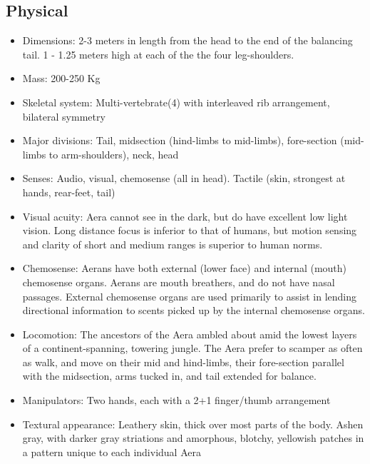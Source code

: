 \subsection{Physical}
\begin{itemize}
\item Dimensions: 2-3 meters in length from the head to the end of the balancing tail. 1 - 1.25 meters high at each of the the four leg-shoulders.

\item Mass: 200-250 Kg

\item Skeletal system: Multi-vertebrate(4) with interleaved rib arrangement, bilateral symmetry

\item Major divisions: Tail, midsection (hind-limbs to mid-limbs), fore-section (mid-limbs to arm-shoulders), neck, head

\item Senses: Audio, visual, chemosense (all in head). Tactile (skin, strongest at hands, rear-feet, tail)

\item Visual acuity: Aera cannot see in the dark, but do have excellent low light vision. Long distance focus is inferior to that of humans, but motion sensing and clarity of short and medium ranges is superior to human norms. 

\item Chemosense: Aerans have both external (lower face) and internal (mouth) chemosense organs. Aerans are mouth breathers, and do not have nasal passages. External chemosense organs are used primarily to assist in lending directional information to scents picked up by the internal chemosense organs. 

\item Locomotion: The ancestors of the Aera ambled about amid the lowest layers of a continent-spanning, towering jungle. The Aera prefer to scamper as often as walk, and move on their mid and hind-limbs, their fore-section parallel with the midsection, arms tucked in, and tail extended for balance.

\item Manipulators: Two hands, each with a 2+1 finger/thumb arrangement

\item Textural appearance: Leathery skin, thick over most parts of the body. Ashen gray, with darker gray striations and amorphous, blotchy, yellowish patches in a pattern unique to each individual Aera
\end{itemize}

